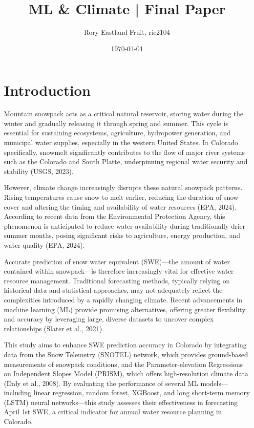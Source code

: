 \documentclass{article}
\begin{document}
\title{\textbf{ML \& Climate | Final Paper}}
\date{\today}
\author{Rory Eastland-Fruit, rie2104}

\maketitle

\section{Introduction}
Mountain snowpack acts as a critical natural reservoir, storing water during the winter and gradually releasing it through spring and summer. This cycle is essential for sustaining ecosystems, agriculture, hydropower generation, and municipal water supplies, especially in the western United States. In Colorado specifically, snowmelt significantly contributes to the flow of major river systems such as the Colorado and South Platte, underpinning regional water security and stability (USGS, 2023).

However, climate change increasingly disrupts these natural snowpack patterns. Rising temperatures cause snow to melt earlier, reducing the duration of snow cover and altering the timing and availability of water resources (EPA, 2024). According to recent data from the Environmental Protection Agency, this phenomenon is anticipated to reduce water availability during traditionally drier summer months, posing significant risks to agriculture, energy production, and water quality (EPA, 2024).

Accurate prediction of snow water equivalent (SWE)—the amount of water contained within snowpack—is therefore increasingly vital for effective water resource management. Traditional forecasting methods, typically relying on historical data and statistical approaches, may not adequately reflect the complexities introduced by a rapidly changing climate. Recent advancements in machine learning (ML) provide promising alternatives, offering greater flexibility and accuracy by leveraging large, diverse datasets to uncover complex relationships (Slater et al., 2021).

This study aims to enhance SWE prediction accuracy in Colorado by integrating data from the Snow Telemetry (SNOTEL) network, which provides ground-based measurements of snowpack conditions, and the Parameter-elevation Regressions on Independent Slopes Model (PRISM), which offers high-resolution climate data (Daly et al., 2008). By evaluating the performance of several ML models—including linear regression, random forest, XGBoost, and long short-term memory (LSTM) neural networks—this study assesses their effectiveness in forecasting April 1st SWE, a critical indicator for annual water resource planning in Colorado.
\end{document}
